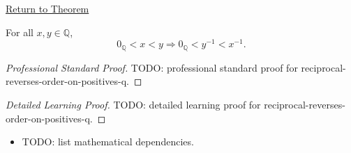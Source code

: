 \newpage
{}
\label{prf:reciprocal-reverses-order-on-positives-q}

\begin{remark*}[Return]
\hyperref[thm:reciprocal-reverses-order-on-positives-q]{Return to Theorem}
\end{remark*}

\begin{theorem*}
For all $x,y\in\mathbb{Q}$,
\[
0_{\mathbb{Q}}<x<y
\Longrightarrow
0_{\mathbb{Q}}<y^{-1}<x^{-1}.
\]
\end{theorem*}

\begin{proof}[Professional Standard Proof]
\LRAProofBodyStart
TODO: professional standard proof for reciprocal-reverses-order-on-positives-q.
\end{proof}

\begin{proof}[Detailed Learning Proof]
\LRAProofBodyStart
TODO: detailed learning proof for reciprocal-reverses-order-on-positives-q.
\end{proof}

\begin{remark*}
\end{remark*}

\begin{dependencies}
\begin{itemize}
  \item TODO: list mathematical dependencies.
\end{itemize}
\end{dependencies}

\clearpage
